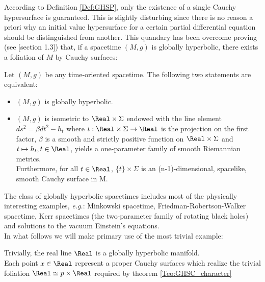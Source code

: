 \documentclass[Main]{subfiles}
\begin{document}
			According to Definition \ref{Def:GHSP}, only the existence of a single Cauchy hypersurface is guaranteed. 
			This is slightly disturbing since there is no reason a priori why an initial value hypersurface for a certain partial differential equation should be distinguished from another.
			This quandary has been overcome proving (see \cite{Baer2008}[section 1.3]) that, if a spacetime $(M,g)$ is globally hyperbolic, there exists a foliation of $M$ by Cauchy surfaces:
			\begin{theorem}\label{Teo:GHSC_character}
				Let $(M,g)$ be any time-oriented spacetime. The following two statements are equivalent:
				\begin{itemize}
					\item $(M,g)$ is globally hyperbolic.
					\item $(M,g)$ is isometric to $ \Real \times \Sigma $ 
						endowed with the line element $ds^2 = \beta dt^2 - h_t$ 
						where $t : \Real \times \Sigma \rightarrow \Real$ is the projection on the first factor, 
						$\beta$ is a smooth and strictly positive function on $\Real \times \Sigma$ 
						and $t \mapsto h_t , t \in \Real$, yields a one-parameter family of smooth Riemannian metrics.\\
						Furthermore, for all $t\in \Real$, $\{t\}\times \Sigma$ is an (n-1)-dimensional, spacelike, smooth Cauchy surface in M.
				\end{itemize}
			\end{theorem}
			
			The class of globally hyperbolic spacetimes includes most of the physically interesting examples, \textit{e.g.}: Minkowski spacetime, Friedman-Robertson-Walker spacetime, Kerr spacetimes (the two-parameter family of rotating black holes) and solutions to the vacuum Einstein's equations. 
			\\
			In what follows we will make primary use of the most trivial example:
			\begin{example}
				Trivially, the real line $\Real$ is a globally hyperbolic manifold.
				\\
				Each point $x\in \Real$ represent a proper Cauchy surfaces which realize the trivial foliation $\Real \simeq {p}\times \Real $ required by theorem \ref{Teo:GHSC_character}
			\end{example}
\end{document}
